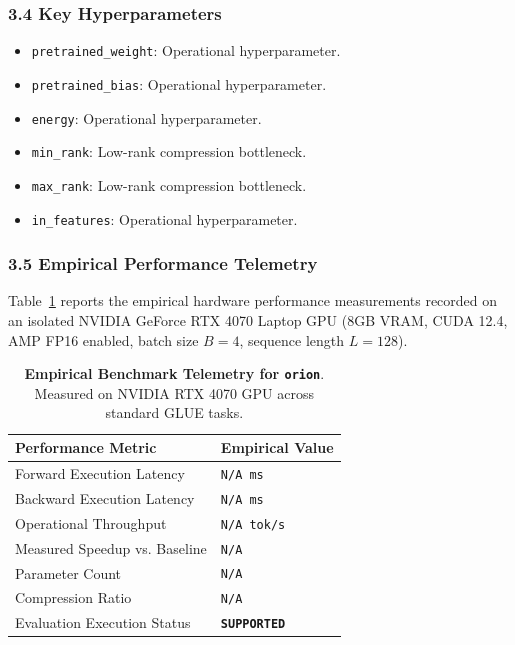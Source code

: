 \subsubsection*{3.4 Key Hyperparameters}
\begin{itemize}
    \item \texttt{pretrained\_weight}: Operational hyperparameter.
    \item \texttt{pretrained\_bias}: Operational hyperparameter.
    \item \texttt{energy}: Operational hyperparameter.
    \item \texttt{min\_rank}: Low-rank compression bottleneck.
    \item \texttt{max\_rank}: Low-rank compression bottleneck.
    \item \texttt{in\_features}: Operational hyperparameter.
\end{itemize}

\subsubsection*{3.5 Empirical Performance Telemetry}
Table~\ref{tab:telemetry_orion} reports the empirical hardware performance measurements recorded on an isolated NVIDIA GeForce RTX 4070 Laptop GPU (8GB VRAM, CUDA 12.4, AMP FP16 enabled, batch size $B=4$, sequence length $L=128$).

\begin{table}[h]
\centering
\small
\caption{\textbf{Empirical Benchmark Telemetry for \texttt{orion}}. Measured on NVIDIA RTX 4070 GPU across standard GLUE tasks.}
\label{tab:telemetry_orion}
\begin{tabularx}{\columnwidth}{lX}
\toprule
\textbf{Performance Metric} & \textbf{Empirical Value} \\
\midrule
Forward Execution Latency & \texttt{N/A ms} \\
Backward Execution Latency & \texttt{N/A ms} \\
Operational Throughput & \texttt{N/A tok/s} \\
Measured Speedup vs. Baseline & \texttt{N/A} \\
Parameter Count & \texttt{N/A} \\
Compression Ratio & \texttt{N/A} \\
Evaluation Execution Status & \textbf{\texttt{SUPPORTED}} \\
\bottomrule
\end{tabularx}
\end{table}

